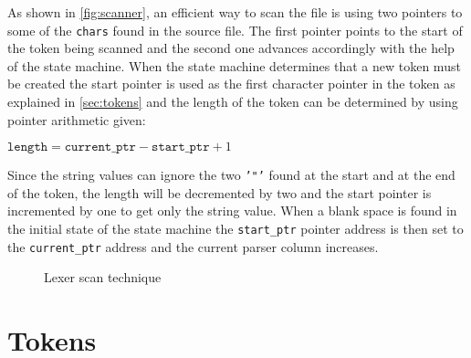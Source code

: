 As shown in \autoref{fig:scanner}, an efficient way to scan the file is using two pointers to some of the \texttt{chars} found in the source file.
The first pointer points to the start of the token being scanned and the second one advances accordingly with the help of the
state machine. When the state machine determines that a new token must be created the start pointer is used as the first character
pointer in the token as explained in \autoref{sec:tokens} and the length of the token can be determined by using pointer arithmetic given:

\begin{center}
$\texttt{length} = \texttt{current\_ptr} - \texttt{start\_ptr} + 1$
\end{center}

Since the string values can ignore the two \texttt{'"'} found at the
start and at the end of the token, the length will be decremented by two and the start pointer is incremented by one to get only the string value.
When a blank space is found in the initial state of the state machine the \texttt{start\_ptr} pointer address is then set to the \texttt{current\_ptr} address
and the current parser column increases.

\begin{figure}[H]
    \centering
    \caption{Lexer scan technique}
    \label{fig:scanner}
\end{figure}

\section{Tokens}
\label{sec:tokens}

